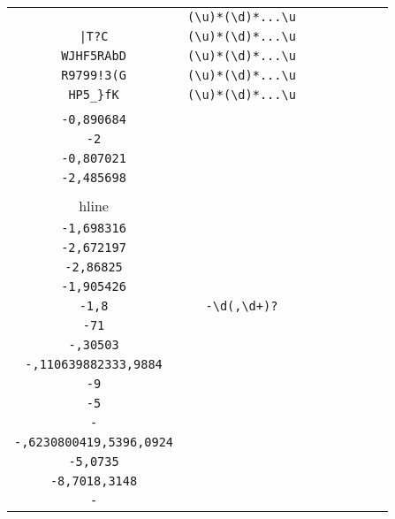 \begin{longtable}{cccccccc}
\begin{tabular}{ll}
    \verb|ca"C| & \verb|(\u)*(\d)*...\u|\\
\verb.|T?C. & \verb|(\u)*(\d)*...\u|\\
\verb|WJHF5RAbD| & \verb|(\u)*(\d)*...\u|\\
\verb|R9799!3(G| & \verb|(\u)*(\d)*...\u|\\
\verb|HP5_}fK| & \verb|(\u)*(\d)*...\u|
\end{tabular}
\\\midrule 
\begin{tabular}{l}
    \verb|-1,287659|\\
\verb|-0,890684|\\
\verb|-2|\\
\verb|-0,807021|\\
\verb|-2,485698|\\
\\hline\\
\verb|-1,698316|\\
\verb|-2,672197|\\
\verb|-2,86825|\\
\verb|-1,905426|\\
\verb|-1,8|
\end{tabular}

&
\verb|-\d(,\d+)?|
&

\begin{tabular}{l}
    \verb|-((\d)*,\d\d\d\d)*(\d)*|\\
\verb|-71|\\
\verb|-,30503|\\
\verb|-,110639882333,9884|\\
\verb|-9|\\
\verb|-5|
\end{tabular}

&

\begin{tabular}{l}
    \verb|-((\d)*,\d\d\d\d)*(\d)*|\\
\verb|-|\\
\verb|-,6230800419,5396,0924|\\
\verb|-5,0735|\\
\verb|-8,7018,3148|\\
\verb|-|
\end{tabular}

&


\end{longtable}
